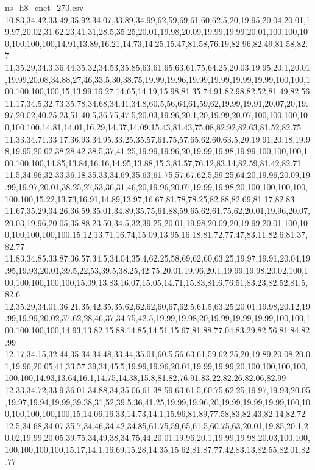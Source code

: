 \begin{filecontents*}[overwrite]{ns_h8_enet_270.csv}
10.83,34.42,33.49,35.92,34.07,33.89,34.99,62,59,69,61,60,62.5,20,19.95,20.04,20.01,19.97,20.02,31.62,23,41,31,28.5,35.25,20.01,19.98,20.09,19.99,19.99,20.01,100,100,100,100,100,100,14.91,13.89,16.21,14.73,14.25,15.47,81.58,76.19,82.96,82.49,81.58,82.7
11,35.29,34.3,36.44,35.32,34.53,35.85,63,61,65,63,61.75,64.25,20.03,19.95,20.1,20.01,19.99,20.08,34.88,27,46,33.5,30,38.75,19.99,19.96,19.99,19.99,19.99,19.99,100,100,100,100,100,100,15,13.99,16.27,14.65,14.19,15.98,81.35,74.91,82.98,82.52,81.49,82.56
11.17,34.5,32.73,35.78,34.68,34.41,34.8,60.5,56,64,61,59,62,19.99,19.91,20.07,20,19.97,20.02,40.25,23,51,40.5,36.75,47.5,20.03,19.96,20.1,20,19.99,20.07,100,100,100,100,100,100,14.81,14.01,16.29,14.37,14.09,15.43,81.43,75.08,82.92,82.63,81.52,82.75
11.33,34.71,33.17,36.93,34.95,33.25,35.57,61.75,57,65,62,60,63.5,20,19.91,20.18,19.98,19.95,20.02,38,28,42,38.5,37,41.25,19.99,19.96,20,19.99,19.98,19.99,100,100,100,100,100,100,14.85,13.84,16.16,14.95,13.88,15.3,81.57,76.12,83.14,82.59,81.42,82.71
11.5,34.96,32.33,36.18,35.33,34.69,35.63,61.75,57,67,62.5,59.25,64,20,19.96,20.09,19.99,19.97,20.01,38.25,27,53,36,31,46,20,19.96,20.07,19.99,19.98,20,100,100,100,100,100,100,15.22,13.73,16.91,14.89,13.97,16.67,81.78,78.25,82.88,82.69,81.17,82.83
11.67,35.29,34.26,36.59,35.01,34.89,35.75,61.88,59,65,62,61.75,62,20.01,19.96,20.07,20.03,19.96,20.05,35.88,23,50,34.5,32,39.25,20.01,19.98,20.09,20,19.99,20.01,100,100,100,100,100,100,15.12,13.71,16.74,15.09,13.95,16.18,81.72,77.47,83.11,82.6,81.37,82.77
11.83,34.85,33.87,36.57,34.5,34.04,35.4,62.25,58,69,62,60,63.25,19.97,19.91,20.04,19.95,19.93,20.01,39.5,22,53,39.5,38.25,42.75,20.01,19.96,20.1,19.99,19.98,20.02,100,100,100,100,100,100,15.09,13.83,16.07,15.05,14.71,15.83,81.6,76.51,83.23,82.52,81.5,82.6
12,35.29,34.01,36.21,35.42,35,35.62,62.62,60,67,62.5,61.5,63.25,20.01,19.98,20.12,19.99,19.99,20.02,37.62,28,46,37,34.75,42.5,19.99,19.98,20,19.99,19.99,19.99,100,100,100,100,100,100,14.93,13.82,15.88,14.85,14.51,15.67,81.88,77.04,83.29,82.56,81.84,82.99
12.17,34.15,32.44,35.34,34.48,33.44,35.01,60.5,56,63,61,59,62.25,20,19.89,20.08,20.01,19.96,20.05,41,33,57,39,34,45.5,19.99,19.96,20.01,19.99,19.99,20,100,100,100,100,100,100,14.93,13.64,16.1,14.75,14.38,15.8,81.82,76.91,83.22,82.26,82.06,82.99
12.33,34.72,33.9,36.01,34.88,34,35.06,61.38,59,63,61.5,60.75,62.25,19.97,19.93,20.05,19.97,19.94,19.99,39.38,31,52,39.5,36,41.25,19.99,19.96,20,19.99,19.99,19.99,100,100,100,100,100,100,15,14.06,16.33,14.73,14.1,15.96,81.89,77.58,83,82.43,82.14,82.72
12.5,34.68,34.07,35.7,34.46,34.42,34.85,61.75,59,65,61.5,60.75,63,20.01,19.85,20.1,20.02,19.99,20.05,39.75,34,49,38,34.75,44,20.01,19.96,20.1,19.99,19.98,20.03,100,100,100,100,100,100,15.17,14.1,16.69,15.28,14.35,15.62,81.87,77.42,83.13,82.55,82.01,82.77

\end{filecontents*}
